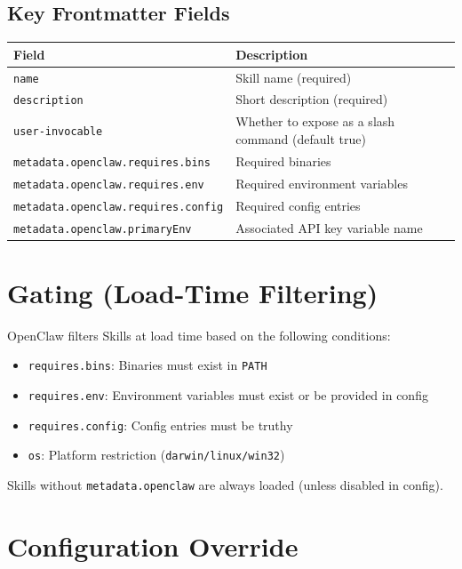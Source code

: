 \subsection{Key Frontmatter Fields}

\begin{center}
\begin{tabular}{ll}
\toprule
\textbf{Field} & \textbf{Description} \\
\midrule
\texttt{name} & Skill name (required) \\
\texttt{description} & Short description (required) \\
\texttt{user-invocable} & Whether to expose as a slash command (default true) \\
\texttt{metadata.openclaw.requires.bins} & Required binaries \\
\texttt{metadata.openclaw.requires.env} & Required environment variables \\
\texttt{metadata.openclaw.requires.config} & Required config entries \\
\texttt{metadata.openclaw.primaryEnv} & Associated API key variable name \\
\bottomrule
\end{tabular}
\end{center}

\section{Gating (Load-Time Filtering)}

OpenClaw filters Skills at load time based on the following conditions:

\begin{itemize}
  \item \texttt{requires.bins}: Binaries must exist in \texttt{PATH}
  \item \texttt{requires.env}: Environment variables must exist or be provided in config
  \item \texttt{requires.config}: Config entries must be truthy
  \item \texttt{os}: Platform restriction (\texttt{darwin/linux/win32})
\end{itemize}

Skills without \texttt{metadata.openclaw} are always loaded (unless disabled in config).

\section{Configuration Override}

